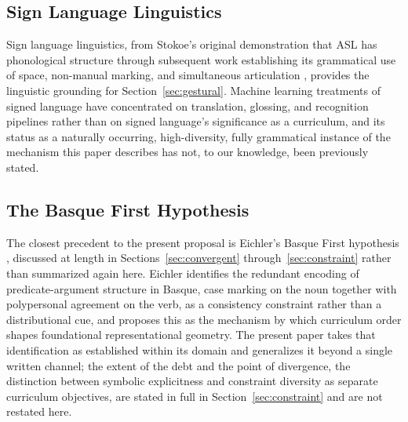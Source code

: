 \documentclass[11pt]{article}
\begin{document}
\subsection{Sign Language Linguistics}
\label{sec:rel-typology}

Sign language linguistics, from Stokoe's original demonstration that ASL has phonological structure \cite{stokoe1960sign} through subsequent work establishing its grammatical use of space, non-manual marking, and simultaneous articulation \cite{sandler2006sign}, provides the linguistic grounding for Section~\ref{sec:gestural}. Machine learning treatments of signed language have concentrated on translation, glossing, and recognition pipelines \cite{camgoz2018neural, koller2019weakly} rather than on signed language's significance as a curriculum, and its status as a naturally occurring, high-diversity, fully grammatical instance of the mechanism this paper describes has not, to our knowledge, been previously stated.

\subsection{The Basque First Hypothesis}
\label{sec:rel-eichler}

The closest precedent to the present proposal is Eichler's Basque First hypothesis \cite{eichler2026basque}, discussed at length in Sections~\ref{sec:convergent} through~\ref{sec:constraint} rather than summarized again here. Eichler identifies the redundant encoding of predicate-argument structure in Basque, case marking on the noun together with polypersonal agreement on the verb, as a consistency constraint rather than a distributional cue, and proposes this as the mechanism by which curriculum order shapes foundational representational geometry. The present paper takes that identification as established within its domain and generalizes it beyond a single written channel; the extent of the debt and the point of divergence, the distinction between symbolic explicitness and constraint diversity as separate curriculum objectives, are stated in full in Section~\ref{sec:constraint} and are not restated here.
\end{document}
